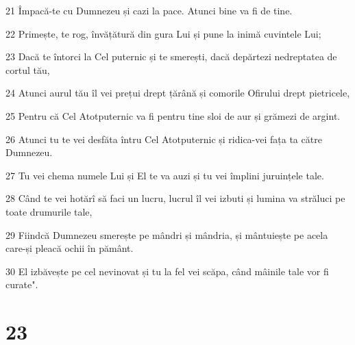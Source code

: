 \par 21 Împacă-te cu Dumnezeu și cazi la pace. Atunci bine va fi de tine.
\par 22 Primește, te rog, învățătură din gura Lui și pune la inimă cuvintele Lui;
\par 23 Dacă te întorci la Cel puternic și te smerești, dacă depărtezi nedreptatea de cortul tău,
\par 24 Atunci aurul tău îl vei prețui drept țărână și comorile Ofirului drept pietricele,
\par 25 Pentru că Cel Atotputernic va fi pentru tine sloi de aur și grămezi de argint.
\par 26 Atunci tu te vei desfăta întru Cel Atotputernic și ridica-vei fața ta către Dumnezeu.
\par 27 Tu vei chema numele Lui și El te va auzi și tu vei împlini juruințele tale.
\par 28 Când te vei hotărî să faci un lucru, lucrul îl vei izbuti și lumina va străluci pe toate drumurile tale,
\par 29 Fiindcă Dumnezeu smerește pe mândri și mândria, și mântuiește pe acela care-și pleacă ochii în pământ.
\par 30 El izbăvește pe cel nevinovat și tu la fel vei scăpa, când mâinile tale vor fi curate".

\chapter{23}

